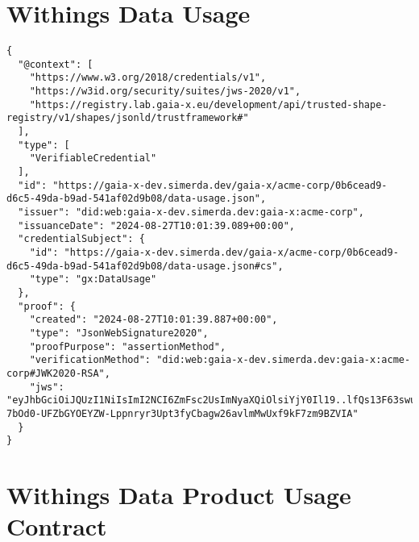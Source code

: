 \section{Withings Data Usage}

\begin{verbatim}
{
  "@context": [
    "https://www.w3.org/2018/credentials/v1",
    "https://w3id.org/security/suites/jws-2020/v1",
    "https://registry.lab.gaia-x.eu/development/api/trusted-shape-registry/v1/shapes/jsonld/trustframework#"
  ],
  "type": [
    "VerifiableCredential"
  ],
  "id": "https://gaia-x-dev.simerda.dev/gaia-x/acme-corp/0b6cead9-d6c5-49da-b9ad-541af02d9b08/data-usage.json",
  "issuer": "did:web:gaia-x-dev.simerda.dev:gaia-x:acme-corp",
  "issuanceDate": "2024-08-27T10:01:39.089+00:00",
  "credentialSubject": {
    "id": "https://gaia-x-dev.simerda.dev/gaia-x/acme-corp/0b6cead9-d6c5-49da-b9ad-541af02d9b08/data-usage.json#cs",
    "type": "gx:DataUsage"
  },
  "proof": {
    "created": "2024-08-27T10:01:39.887+00:00",
    "type": "JsonWebSignature2020",
    "proofPurpose": "assertionMethod",
    "verificationMethod": "did:web:gaia-x-dev.simerda.dev:gaia-x:acme-corp#JWK2020-RSA",
    "jws": "eyJhbGciOiJQUzI1NiIsImI2NCI6ZmFsc2UsImNyaXQiOlsiYjY0Il19..lfQs13F63swuU1nOWNYtowu4Jz9u8rf6MgrbKlBYR7R8qAYi4O9wb2SWFIJvHUI7QqZpvQ05rJO8hjhqhCwZ_fuh_TEGt3Ec1HH5MY49gmZTZetUaDhdNY5Mihi2i7hlat4D8wYwXjU0NWXIlMZGk0H8Xg3AbEspRCm2ZfFEXQz0ZjqpignOaZlXUggxD8AVw3Jjdva7eGLuMEASQBYkAwR3eorPX2_8fdcXhaI3EbhfIsvTF6Ph6bBc60UbTq4gPMkPD1XBimtbjmgJIOLoVu0UB-7bOd0-UFZbGYOEYZW-Lppnryr3Upt3fyCbagw26avlmMwUxf9kF7zm9BZVIA"
  }
}
\end{verbatim}

\section{Withings Data Product Usage Contract}

